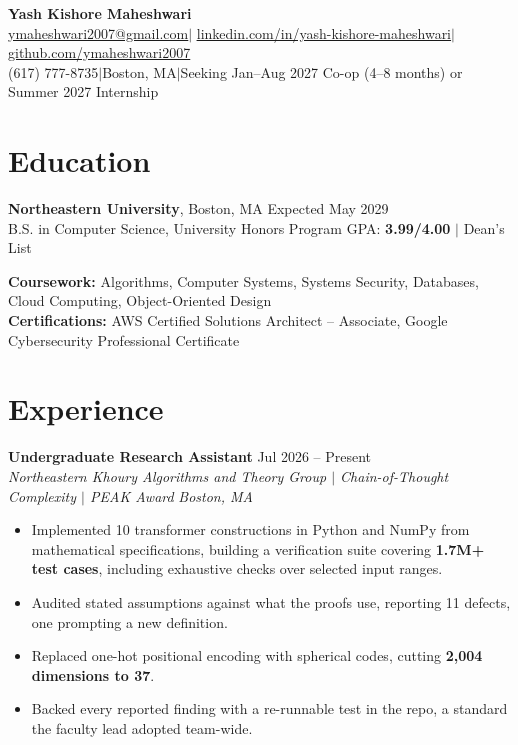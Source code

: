 \documentclass[letterpaper,10pt]{article}
\let\hrefplain\href
\renewcommand{\href}[2]{\hrefplain{#1}{\uline{#2}}}
\newcommand{\entrysize}{\fontsize{10.5}{12}\selectfont}
\newif\ifentrygap
\newcommand{\entrygapsize}{6.4pt}
\newcommand{\entryfirstgap}{0.4pt}
\newcommand{\entrysep}{\ifentrygap\vspace{\entrygapsize}\else\vspace{\entryfirstgap}\fi\global\entrygaptrue}
\let\entryorigsection\section
\renewcommand{\section}{\global\entrygapfalse\entryorigsection}
\newcommand{\entry}[4]{\entrysep{\entrysize\textbf{#1}} \hfill #2 \\ \textit{#3} \hfill \textit{#4}}
\newcommand{\hsep}{\hspace{0.2222em minus 0.1em}$\vert$\hspace{0.2222em minus 0.1em}}
\begin{document}
\begin{center}
  {\fontsize{18}{20}\selectfont\bfseries Yash Kishore Maheshwari}\\[3pt]
  \href{mailto:ymaheshwari2007@gmail.com}{ymaheshwari2007@gmail.com}\hsep%
  \href{https://linkedin.com/in/yash-kishore-maheshwari}{linkedin.com/in/yash-kishore-maheshwari}\hsep%
  \href{https://github.com/ymaheshwari2007}{github.com/ymaheshwari2007}\\
  (617) 777-8735\hsep Boston, MA\hsep Seeking Jan--Aug 2027 Co-op (4--8 months) or Summer 2027 Internship
\end{center}

\section{Education}

\textbf{Northeastern University}, Boston, MA \hfill Expected May 2029 \\
B.S. in Computer Science, University Honors Program \hfill
GPA: \textbf{3.99/4.00} $\vert$ Dean's List

\vspace{1pt}
\textbf{Coursework:} Algorithms, Computer Systems, Systems Security, Databases, Cloud Computing, Object-Oriented Design \\
\textbf{Certifications:} AWS Certified Solutions Architect -- Associate, Google Cybersecurity Professional Certificate

\section{Experience}

\entry{Undergraduate Research Assistant}{Jul 2026 -- Present}
      {Northeastern Khoury Algorithms and Theory Group $\vert$ Chain-of-Thought Complexity $\vert$ PEAK Award}{Boston, MA}
\begin{itemize}
  \item Implemented 10 transformer constructions in Python and NumPy from mathematical specifications, building a
        verification suite covering \textbf{1.7M+ test cases}, including exhaustive checks over selected input ranges.
  \item Audited stated assumptions against what the proofs use, reporting 11 defects, one prompting a new definition.
  \item Replaced one-hot positional encoding with spherical codes, cutting \textbf{2,004 dimensions to 37}.
  \item Backed every reported finding with a re-runnable test in the repo, a standard the faculty lead adopted team-wide.
\end{itemize}
\end{document}
